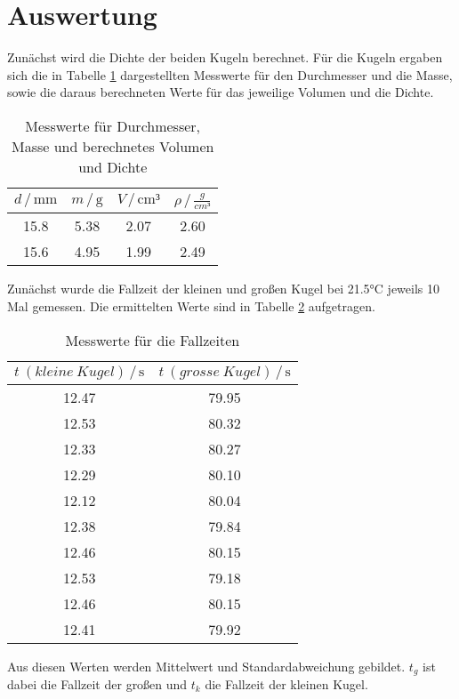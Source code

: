 \section{Auswertung}
\label{sec:Auswertung}

Zunächst wird die Dichte der beiden Kugeln berechnet. Für die Kugeln 
ergaben sich die in Tabelle \ref{tab:Dichte} dargestellten Messwerte für den 
Durchmesser und die Masse, sowie die daraus berechneten Werte für das 
jeweilige Volumen und die Dichte.

\begin{table}
\centering
\caption{Messwerte für Durchmesser, Masse und berechnetes Volumen und Dichte}
\label{tab:Dichte}
\begin{tabular}{c c c c}
\toprule
$d \,/\, \si{\milli\meter}$ & $m \,/\, \si{\gram}$ & $V \,/\, \si{\cm³}$ & $\rho \,/\, \si{\frac{g}{cm³}}$\\
\midrule
15.8 &  5.38 & 2.07 & 2.60\\
15.6 &  4.95 & 1.99 & 2.49\\
\bottomrule
\end{tabular}
\end{table}

Zunächst wurde die Fallzeit der kleinen und großen Kugel bei 21.5°C 
jeweils 10 Mal gemessen. 
Die ermittelten Werte sind in Tabelle \ref{tab:Zeit} aufgetragen. 

\begin{table}
\centering
\caption{Messwerte für die Fallzeiten}
\label{tab:Zeit}
\begin{tabular}{c c}
\toprule
$t\: (kleine\: Kugel)\,/\, \si{\second}$ & $t\: (grosse\: Kugel) \,/\, \si{\second}$\\
\midrule
12.47 & 79.95\\
12.53 & 80.32\\
12.33 & 80.27\\
12.29 & 80.10\\
12.12 & 80.04\\
12.38 & 79.84\\
12.46 & 80.15\\
12.53 & 79.18\\
12.46 & 80.15\\
12.41 & 79.92\\
\bottomrule
\end{tabular}
\end{table}

Aus diesen Werten werden Mittelwert und Standardabweichung gebildet.
$t_g$ ist dabei die Fallzeit der großen und $t_k$ die Fallzeit der kleinen
Kugel.


